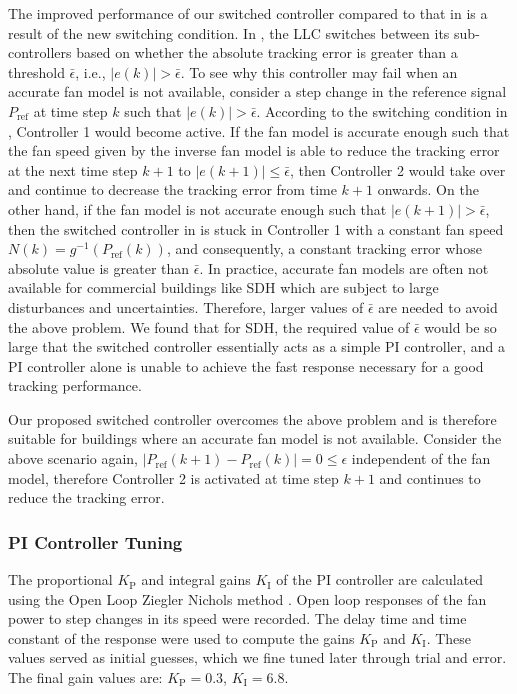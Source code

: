 The improved performance of our switched controller compared to that in \cite{Vrettos:2016flexlab1} is a result of the new switching condition. 
In \cite{Vrettos:2016flexlab1}, the LLC switches between its sub-controllers based on whether the absolute tracking error is greater than a threshold $\bar{\epsilon}$, i.e., $|e(k)|>\bar{\epsilon}$. 
To see why this controller may fail when an accurate fan model is not available, consider a step change in the reference signal $P_{\text{ref}}$ at time step $k$ such that $|e(k)|>\bar{\epsilon}$. 
According to the switching condition in \cite{Vrettos:2016flexlab1}, Controller 1 would become active.
If the fan model is accurate enough such that the fan speed given by the inverse fan model is able to reduce the tracking error at the next time step $k+1$ to $|e(k+1)| \leq \bar{\epsilon}$, then Controller 2 would take over and continue to decrease the tracking error from time $k+1$ onwards.
On the other hand, if the fan model is not accurate enough such that $|e(k+1)| > \bar{\epsilon}$, then the switched controller in \cite{Vrettos:2016flexlab1} is stuck in Controller 1 with a constant fan speed $N(k) = g^{-1}(P_{\text{ref}}(k))$, %
and consequently, a constant tracking error whose absolute value is greater than $\bar{\epsilon}$.
In practice, accurate fan models are often not available for commercial buildings like SDH which are subject to large disturbances and uncertainties. 
Therefore, larger values of $\bar{\epsilon}$ are needed to avoid the above problem. 
We found that for SDH, the required value of $\bar{\epsilon}$ would be so large that the switched controller essentially acts as a simple PI controller, and a PI controller alone is unable to achieve the fast response necessary for a good tracking performance.%

Our proposed switched controller overcomes the above problem and is therefore suitable for buildings where an accurate fan model is not available. Consider the above scenario again, $|P_{\text{ref}}(k+1) - P_{\text{ref}}(k)| = 0 \leq \epsilon$ independent of the fan model, therefore Controller 2 is activated at time step $k+1$ and continues to reduce the tracking error.





\subsubsection{PI Controller Tuning}\label{sec:PItuning}
The proportional $K_\text{P}$ and integral gains $K_\text{I}$ of the PI controller are calculated using the %
Open Loop Ziegler Nichols method \cite{Moderncontrol_book}. Open loop responses of the fan power to step changes in its speed were recorded. 
The delay time and time constant of the response were used to compute the gains $K_\text{P}$ and $K_\text{I}$.
These values served as initial guesses, which we fine tuned later through trial and error. 
The final gain values are: $K_\text{P} = 0.3$, $K_\text{I} = 6.8$.

